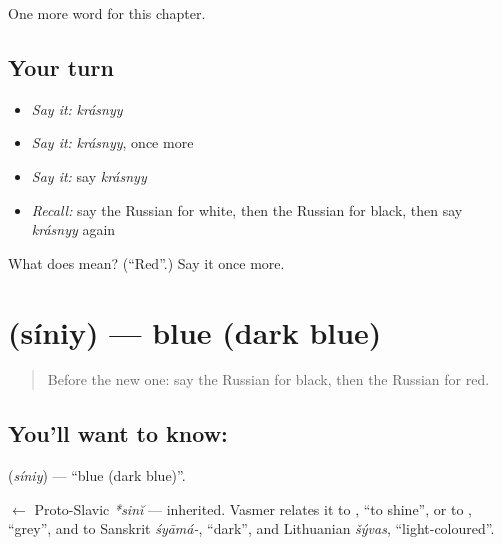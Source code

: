\begin{grammarlens}[title={What you've built}]
One more word for this chapter.
\end{grammarlens}

\subsection*{Your turn}
\begin{itemize}
\raggedright
  \item \emph{Say it:} \emph{krásnyy}
  \item \emph{Say it:} \emph{krásnyy}, once more
  \item \emph{Say it:} say \emph{krásnyy}
  \item \emph{Recall:} say the Russian for white, then the Russian for black, then say \emph{krásnyy} again
\end{itemize}

\begin{tcolorbox}[breakable,colback=teal!4,colframe=teal!35!black,title={Before you move on}]
What does  mean? (\textquotedblleft{}Red\textquotedblright{}.) Say it once more.
\end{tcolorbox}
\section[\texorpdfstring{\ru{синий} (síniy)}{синий (síniy)}]{ (síniy) — blue (dark blue)}

\label{lesson:RU-C63-blue}



\begin{quote}
Before the new one: say the Russian for black, then the Russian for red.
\end{quote}

\subsection*{You'll want to know: }
\textbf{} (\emph{síniy}) — \textquotedblleft{}blue (dark blue)\textquotedblright{}.

\begin{cousinweb}
\textbf{} $\leftarrow$ Proto-Slavic \emph{*sinĭ} — inherited. Vasmer relates it to \emph{}, \textquotedblleft{}to shine\textquotedblright{}, or to \emph{}, \textquotedblleft{}grey\textquotedblright{}, and to Sanskrit \emph{śyāmá-}, \textquotedblleft{}dark\textquotedblright{}, and Lithuanian \emph{šývas}, \textquotedblleft{}light-coloured\textquotedblright{}.
\end{cousinweb}

